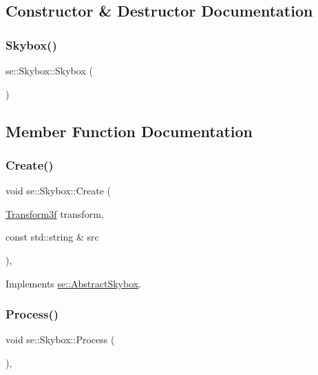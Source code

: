 \subsection{Constructor \& Destructor Documentation}
\mbox{\label{classse_1_1_skybox_a88672cc9288aa769313868aac6646cb7}} 
\subsubsection{\texorpdfstring{Skybox()}{Skybox()}}
{\footnotesize\ttfamily se\+::\+Skybox\+::\+Skybox (\begin{DoxyParamCaption}{ }\end{DoxyParamCaption})}



\subsection{Member Function Documentation}
\mbox{\label{classse_1_1_skybox_a224bf849fd73b70f59613ebd572fd2ff}} 
\subsubsection{\texorpdfstring{Create()}{Create()}}
{\footnotesize\ttfamily void se\+::\+Skybox\+::\+Create (\begin{DoxyParamCaption}\item[{\mbox{\hyperlink{classse_1_1_transform3f}{Transform3f}}}]{transform,  }\item[{const std\+::string \&}]{src }\end{DoxyParamCaption})\hspace{0.3cm}{\ttfamily [override]}, {\ttfamily [virtual]}}



Implements \mbox{\hyperlink{classse_1_1_abstract_skybox_ad9c98023e2ae2cfbb6c84929a1b9f46b}{se\+::\+Abstract\+Skybox}}.

\mbox{\label{classse_1_1_skybox_acd2b0707c02b2a9ac48bcdd79608801c}} 
\subsubsection{\texorpdfstring{Process()}{Process()}}
{\footnotesize\ttfamily void se\+::\+Skybox\+::\+Process (\begin{DoxyParamCaption}{ }\end{DoxyParamCaption})\hspace{0.3cm}{\ttfamily [override]}, {\ttfamily [virtual]}}



